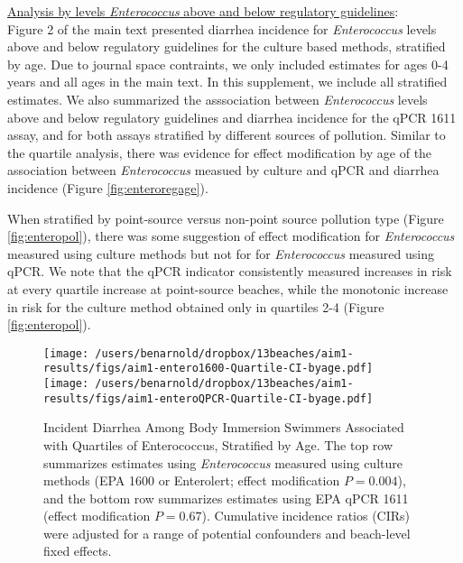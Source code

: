 \documentclass[12pt]{article}\usepackage[]{graphicx}\usepackage[]{color}
\begin{document}
\medskip
\noindent \underline{Analysis by levels \textit{Enterococcus} above and below regulatory guidelines}: \\
Figure 2 of the main text presented diarrhea incidence for \textit{Enterococcus} levels above and below regulatory guidelines for the culture based methods, stratified by age.  Due to journal space contraints, we only included estimates for ages 0-4 years and all ages in the main text.  In this supplement, we include all stratified estimates. We also summarized the asssociation between \emph{Enterococcus} levels above and below regulatory guidelines and diarrhea incidence for the qPCR 1611 assay, and for both assays stratified by different sources of pollution. Similar to the quartile analysis, there was evidence for effect modification by age of the association between \textit{Enterococcus} measued by culture and qPCR and diarrhea incidence (Figure \ref{fig:enteroregage}).  

When stratified by point-source versus non-point source pollution type (Figure \ref{fig:enteropol}), there was some suggestion of effect modification for \textit{Enterococcus} measured using culture methods but not for for \textit{Enterococcus} measured using qPCR. We note that the qPCR indicator consistently measured increases in risk at every quartile increase at point-source beaches, while the monotonic increase in risk for the culture method obtained only in quartiles 2-4 (Figure \ref{fig:enteropol}).


\begin{landscape}
\begin{figure}
\begin{center}
\texttt{[image: /users/benarnold/dropbox/13beaches/aim1-results/figs/aim1-entero1600-Quartile-CI-byage.pdf]} \\
\texttt{[image: /users/benarnold/dropbox/13beaches/aim1-results/figs/aim1-enteroQPCR-Quartile-CI-byage.pdf]}
\caption{Incident Diarrhea Among Body Immersion Swimmers Associated with Quartiles of Enterococcus, Stratified by Age. The top row summarizes estimates using \textit{Enterococcus} measured using culture methods (EPA 1600 or Enterolert; effect modification $P=0.004$), and the bottom row summarizes estimates using EPA qPCR 1611 (effect modification $P=0.67$).  Cumulative incidence ratios (CIRs) were adjusted for a range of potential confounders and beach-level fixed effects.   \label{fig:Qenteroage}}
\end{center}
\end{figure}
\end{landscape}
\end{document}
